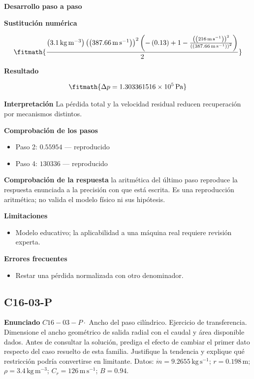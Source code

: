 \documentclass[10pt,openany]{book}
\begin{document}
\noindent\textbf{Desarrollo paso a paso}



\noindent\textbf{Sustitución numérica}

\[
\fitmath{\frac{\left(3.1\,\mathrm{kg}\,\mathrm{m}^{-3}\right) \left(\left(387.66\,\mathrm{m}\,\mathrm{s}^{-1}\right)\right)^{2} \left(- \left(0.13\right) + 1 - \frac{\left(\left(216\,\mathrm{m}\,\mathrm{s}^{-1}\right)\right)^{2}}{\left(\left(387.66\,\mathrm{m}\,\mathrm{s}^{-1}\right)\right)^{2}}\right)}{2}}
\]

\noindent\textbf{Resultado}

\[
\fitmath{\Delta p=1.303361516\times10^{5}\,\mathrm{Pa}}
\]

\noindent\textbf{Interpretación}
La pérdida total y la velocidad residual reducen recuperación por mecanismos distintos.

\noindent\textbf{Comprobación de los pasos}
\begin{itemize}
\item Paso 2: $0.55954$ — reproducido
\item Paso 4: $130336$ — reproducido
\end{itemize}

\noindent\textbf{Comprobación de la respuesta} la aritmética del último paso reproduce la respuesta enunciada a la precisión con que está escrita. Es una reproducción aritmética; no valida el modelo físico ni sus hipótesis.

\noindent\textbf{Limitaciones}
\begin{itemize}
\item Modelo educativo; la aplicabilidad a una máquina real requiere revisión experta.
\end{itemize}

\noindent\textbf{Errores frecuentes}
\begin{itemize}
\item Restar una pérdida normalizada con otro denominador.
\end{itemize}
\subsection*{C16-03-P}

\noindent\textbf{Enunciado}
\(C16-03-P \cdot\) Ancho del paso cilíndrico. Ejercicio de transferencia. Dimensione el ancho geométrico de salida radial con el caudal y área disponible dados. Antes de consultar la solución, prediga el efecto de cambiar el primer dato respecto del caso resuelto de esta familia. Justifique la tendencia y explique qué restricción podría convertirse en limitante. Datos: \(\dot m=9.2655\, \mathrm{kg}\,\mathrm{s}^{-1}\); \(r=0.198\, \mathrm{m}\); \(\rho=3.4\, \mathrm{kg}\,\mathrm{m}^{-3}\); \(C_r=126\, \mathrm{m}\,\mathrm{s}^{-1}\); \(B=0.94\).
\end{document}
